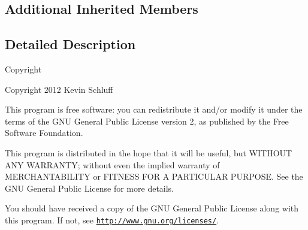\subsection*{Additional Inherited Members}


\subsection{Detailed Description}
\begin{DoxyCopyright}{Copyright}

\end{DoxyCopyright}
Copyright 2012 Kevin Schluff

This program is free software\-: you can redistribute it and/or modify it under the terms of the G\-N\-U General Public License version 2, as published by the Free Software Foundation.

This program is distributed in the hope that it will be useful, but W\-I\-T\-H\-O\-U\-T A\-N\-Y W\-A\-R\-R\-A\-N\-T\-Y; without even the implied warranty of M\-E\-R\-C\-H\-A\-N\-T\-A\-B\-I\-L\-I\-T\-Y or F\-I\-T\-N\-E\-S\-S F\-O\-R A P\-A\-R\-T\-I\-C\-U\-L\-A\-R P\-U\-R\-P\-O\-S\-E. See the G\-N\-U General Public License for more details.

You should have received a copy of the G\-N\-U General Public License along with this program. If not, see \href{http://www.gnu.org/licenses/}{\tt http\-://www.\-gnu.\-org/licenses/}. 

